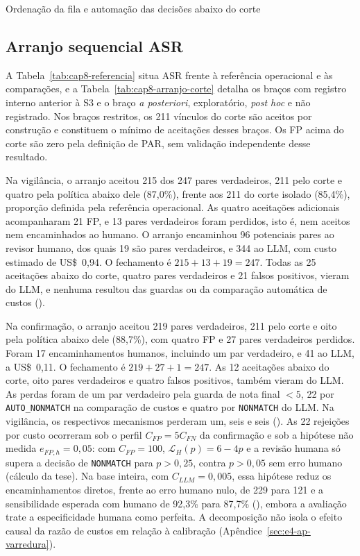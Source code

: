 \begin{chapter}{Ordenação da fila e automação das decisões abaixo do corte}
\subsection{Arranjo sequencial ASR}\label{sec:e4-arranjo}

A Tabela~\ref{tab:cap8-referencia} situa ASR frente à referência operacional e às comparações, e a Tabela~\ref{tab:cap8-arranjo-corte} detalha os braços com registro interno anterior à S3 e o braço \textit{a posteriori}, exploratório, \textit{post hoc} e não registrado. Nos braços restritos, os 211 vínculos do corte são aceitos por construção e constituem o mínimo de aceitações desses braços. Os FP acima do corte são zero pela definição de PAR, sem validação independente desse resultado.



Na vigilância, o arranjo aceitou 215 dos 247 pares verdadeiros, 211 pelo corte e quatro pela política abaixo dele (87,0\%), frente aos 211 do corte isolado (85,4\%), proporção definida pela referência operacional. As quatro aceitações adicionais acompanharam 21 FP, e 13 pares verdadeiros foram perdidos, isto é, nem aceitos nem encaminhados ao humano. O arranjo encaminhou 96 potenciais pares ao revisor humano, dos quais 19 são pares verdadeiros, e 344 ao LLM, com custo estimado de US\$~0,94. O fechamento é $215+13+19=247$. Todas as 25 aceitações abaixo do corte, quatro pares verdadeiros e 21 falsos positivos, vieram do LLM, e nenhuma resultou das guardas ou da comparação automática de custos ().

Na confirmação, o arranjo aceitou 219 pares verdadeiros, 211 pelo corte e oito pela política abaixo dele (88,7\%), com quatro FP e 27 pares verdadeiros perdidos. Foram 17 encaminhamentos humanos, incluindo um par verdadeiro, e 41 ao LLM, a US\$~0,11. O fechamento é $219+27+1=247$. As 12 aceitações abaixo do corte, oito pares verdadeiros e quatro falsos positivos, também vieram do LLM. As perdas foram de um par verdadeiro pela guarda de nota final $<5$, 22 por \texttt{AUTO\_NONMATCH} na comparação de custos e quatro por \texttt{NONMATCH} do LLM. Na vigilância, os respectivos mecanismos perderam um, seis e seis (). As 22 rejeições por custo ocorreram sob o perfil $C_{FP}=5C_{FN}$ da confirmação e sob a hipótese não medida $e_{FP,h}=0{,}05$: com $C_{FP}=100$, $\mathcal{L}_H(p)=6-4p$ e a revisão humana só supera a decisão de \texttt{NONMATCH} para $p>0{,}25$, contra $p>0{,}05$ sem erro humano (cálculo da tese). Na base inteira, com $C_{LLM}=0{,}005$, essa hipótese reduz os encaminhamentos diretos, frente ao erro humano nulo, de 229 para 121 e a sensibilidade esperada com humano de 92,3\% para 87,7\% (), embora a avaliação trate a especificidade humana como perfeita. A decomposição não isola o efeito causal da razão de custos em relação à calibração (Apêndice~\ref{sec:e4-ap-varredura}).


\end{chapter}
